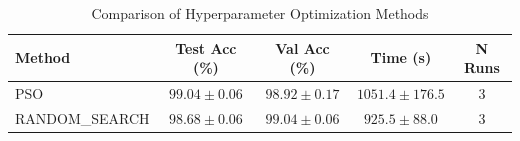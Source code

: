 \begin{table}[h]
\centering
\caption{Comparison of Hyperparameter Optimization Methods}
\label{tab:comparison}
\begin{tabular}{lcccc}
\toprule
Method & Test Acc (\%) & Val Acc (\%) & Time (s) & N Runs \\
\midrule
PSO & $99.04 \pm 0.06$ & $98.92 \pm 0.17$ & $1051.4 \pm 176.5$ & 3 \\
RANDOM_SEARCH & $98.68 \pm 0.06$ & $99.04 \pm 0.06$ & $925.5 \pm 88.0$ & 3 \\
\bottomrule
\end{tabular}
\end{table}